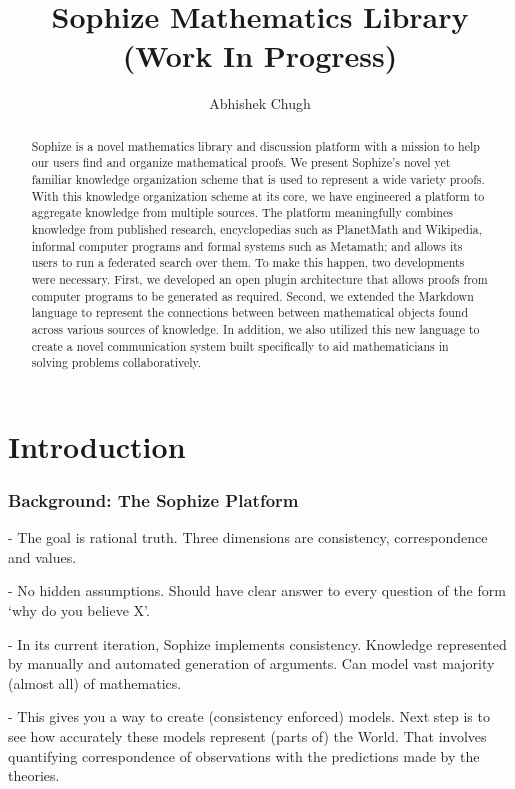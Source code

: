 \documentclass[a4paper]{article}
\title{Sophize Mathematics Library (Work In Progress) }
\author{ Abhishek Chugh }
\begin{document}
\maketitle

\begin{abstract}
Sophize is a novel mathematics library and discussion platform with a mission to help our users find and organize mathematical proofs. We present Sophize's novel yet familiar knowledge organization scheme that is used to represent a wide variety proofs. With this knowledge organization scheme at its core, we have engineered a platform to aggregate knowledge from multiple sources. The platform meaningfully combines knowledge from published research, encyclopedias such as PlanetMath and Wikipedia, informal computer programs and formal systems such as Metamath; and allows its users to run a federated search over them. To make this happen, two developments were necessary. First, we developed an open plugin architecture that allows proofs from computer programs to be generated as required. Second, we extended the Markdown language to represent the connections between between mathematical objects found across various sources of knowledge. In addition, we also utilized this new language to create a novel communication system built specifically to aid mathematicians in solving problems collaboratively.

\end{abstract}

\vskip 32pt

\section{Introduction}

\subsubsection*{Background: The Sophize Platform}

- The goal is rational truth. Three dimensions are consistency, correspondence and values.

- No hidden assumptions. Should have clear answer to every question of the form `why do you believe X'.

- In its current iteration, Sophize implements consistency. Knowledge represented by manually and automated generation of arguments. Can model vast majority (almost all) of mathematics.

- This gives you a way to create (consistency enforced) models. Next step is to see how accurately these models represent (parts of) the World. That involves quantifying correspondence of observations with the predictions made by the theories.
\end{document}
